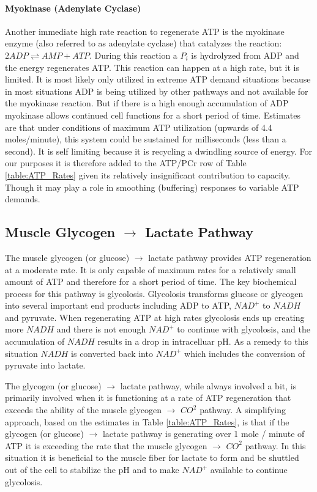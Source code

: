 \paragraph{Myokinase (Adenylate Cyclase)}

Another immediate high rate reaction to regenerate ATP is the myokinase enzyme (also referred to as adenylate cyclase) that catalyzes the reaction: $2ADP \rightleftharpoons AMP + ATP$. During this reaction a $P_i$ is hydrolyzed from ADP and the energy regenerates ATP. This reaction can happen at a high rate, but it is limited. It is most likely only utilized in extreme ATP demand situations because in most situations ADP is being utilized by other pathways and not available for the myokinase reaction. But if there is a high enough accumulation of ADP myokinase allows continued cell functions for a short period of time. Estimates are that under conditions of maximum ATP utilization (upwards of 4.4 moles/minute), this system could be sustained for milliseconds (less than a second). It is self limiting because it is recycling a dwindling source of energy. For our purposes it is therefore added to the ATP/PCr row of Table \ref{table:ATP_Rates} given its relatively insignificant contribution to capacity. Though it may play a role in smoothing (buffering) responses to variable ATP demands.

\subsection{Muscle Glycogen $\rightarrow$ Lactate Pathway}

The muscle glycogen (or glucose) $\rightarrow$ lactate pathway provides ATP regeneration at a moderate rate. It is only capable of maximum rates for a relatively small amount of ATP and therefore for a short period of time. The key biochemical process for this pathway is glycolosis. 
Glycolosis transforms glucose or glycogen into several important end products including ADP to ATP, $NAD^+$ to $NADH$ and pyruvate. When regenerating ATP at high rates glycolosis ends up creating more $NADH$ and there is not enough $NAD^+$ to continue with glycolosis, and the accumulation of $NADH$ results in a drop in intracelluar pH. As a remedy to this situation $NADH$ is converted back into $NAD^+$ which includes the conversion of pyruvate into lactate.

The glycogen (or glucose) $\rightarrow$ lactate pathway, while always involved a bit, is primarily involved when it is functioning at a rate of ATP regeneration that exceeds the ability of the muscle glycogen $\rightarrow$ $CO^2$ pathway. A simplifying approach, based on the estimates in Table \ref{table:ATP_Rates}, is that if the glycogen (or glucose) $\rightarrow$ lactate pathway is generating over 1 mole / minute of ATP it is exceeding the rate that the muscle glycogen $\rightarrow$ $CO^2$ pathway. In this situation it is beneficial to the muscle fiber for lactate to form and be shuttled out of the cell to stabilize the pH and to make $NAD^+$ available to continue glycolosis. 

